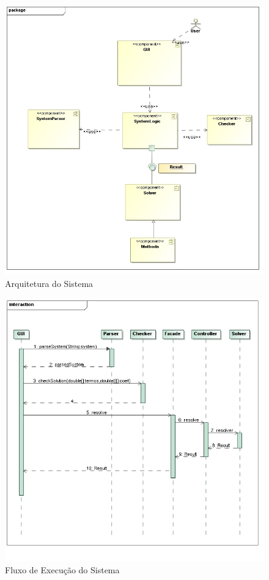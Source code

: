 \documentclass[a4paper,10pt]{report}
\begin{document}
\begin{figure}
 \centering
 \includegraphics[width=\textwidth]{MSN1}
 \caption{Arquitetura do Sistema}
 \label{fig:arquitetura}
\end{figure}


\begin{figure}
 \centering
 \includegraphics[width=\textwidth]{MSNFlow}
 \caption{Fluxo de Execução do Sistema}
 \label{fig:fluxo}
\end{figure}
\end{document}

